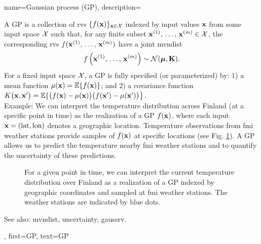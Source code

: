 {name={Gaussian process (GP)},
  description={A GP is a collection of \glspl{rv} 
  	$\{f({\bf x})\}_{{\bf x} \in \mathcal{X}}$ indexed by input values ${\bf x}$ 
  	from some input space $\mathcal{X}$ such that, for any finite subset 
  	${\bf x}^{(1)}, \,\ldots, \,{\bf x}^{(m)} \in \mathcal{X}$, 
  	the corresponding \glspl{rv} $f({\bf x}^{(1)}, \,\ldots, \,{\bf x}^{(m)})$ 
	have a joint \gls{mvndist} 
  	\[
  	f \left( {\bf x}^{(1)}, \,\ldots, \,{\bf x}^{(m)} \right) \sim \mathcal{N}(\boldsymbol{\mu}, \mathbf{K}).
  	\]
  	For a fixed input space $\mathcal{X}$, a GP is fully specified (or parameterized) by: 1) a \gls{mean} \gls{function} $\mu({\bf x}) = \mathbb{E}\{ f({\bf x})\}$;
  	and 2) a \gls{covariance} \gls{function} $K\big({\bf x},{\bf x}'\big)= \mathbb{E}\{ \big(f({\bf x})-\mu({\bf x})\big) \big(f({\bf x}')-\mu({\bf x}')\big) \big\}$.\\
  	Example: We can interpret the temperature distribution across Finland (at a specific 
  	point in time) as the \gls{realization} of a GP $f({\bf x})$, where each input ${\bf x} = (\text{lat}, \text{lon})$ 
  	denotes a geographic location. Temperature observations from \gls{fmi} weather stations provide 
  	\glspl{sample} of $f({\bf x})$ at specific locations (see Fig. \ref{fig_gp_FMI_dict}). A GP allows us to 
  	predict the temperature nearby \gls{fmi} weather stations and to quantify the \gls{uncertainty} 
  	of these \glspl{prediction}. 
  	\begin{figure}[H]
  	\begin{center}
		\vspace*{-15mm}
	\end{center}
	\caption{For a given point in time, we can interpret the current temperature distribution 
	over Finland as a \gls{realization} of a GP indexed by geographic coordinates and 
	sampled at \gls{fmi} weather stations. The weather stations are indicated by blue dots. \label{fig_gp_FMI_dict}}
	\end{figure}
	See also: \gls{mvndist}, \gls{uncertainty}, \gls{gaussrv}.}, 
  first={GP}, 
  text={GP}
}

